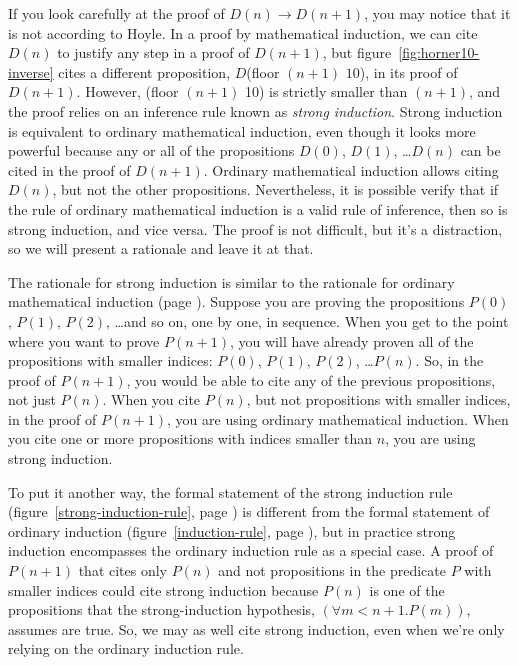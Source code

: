 If you look carefully at the proof of $D(n) \rightarrow D(n+1)$,
you may notice that it is not according to Hoyle.
In a proof by mathematical induction,
we can cite $D(n)$ to justify any step in a proof of $D(n+1)$,
but figure~\ref{fig:horner10-inverse} cites a different
proposition, $D$\textsf{(floor $(n+1)$ $10$)},
in its proof of $D(n+1)$.
However, \textsf{(floor $(n+1)$ 10)}
is strictly smaller than $(n+1)$, and
the proof relies on an inference rule
known as \emph{strong induction}.
Strong induction is equivalent to ordinary mathematical induction,
even though it looks more powerful because any or all of the
propositions $D(0)$, $D(1)$, \dots $D(n)$ can be cited in the proof of $D(n+1)$.
Ordinary mathematical induction allows citing $D(n)$, but not the other
propositions.
Nevertheless, it is possible verify that if the rule of ordinary mathematical induction
is a valid rule of inference, then so is strong induction, and vice versa.
The proof is not difficult, but it's a distraction,
so we will present a rationale and leave it at that.

\label{strong-induction-rationale}
The rationale for
strong induction is similar to
the rationale for ordinary mathematical induction (page \pageref{induction-rationale}).
Suppose you are proving the propositions
$P(0)$, $P(1)$, $P(2)$, \dots and so on,
one by one, in sequence.
When you get to the point where you want to prove $P(n+1)$,
you will have already proven all of the propositions
with smaller indices:
$P(0)$, $P(1)$, $P(2)$, \dots $P(n)$.
So, in the proof of $P(n+1)$, you would be able to
cite any of the previous propositions, not just $P(n)$.
When you cite $P(n)$, but not propositions with smaller indices,
in the proof of $P(n+1)$, you are using ordinary mathematical induction.
When you cite one or more propositions with indices smaller than $n$,
you are using strong induction.

To put it another way, the formal statement of the strong induction rule
(figure~\ref{strong-induction-rule}, page \pageref{strong-induction-rule})
is different from the formal statement of ordinary induction
(figure~\ref{induction-rule}, page \pageref{induction-rule}), but
in practice strong induction encompasses the ordinary induction rule
as a special case. A proof of $P(n+1)$ that cites only $P(n)$
and not propositions in the predicate $P$ with smaller indices
could cite strong induction because $P(n)$ is one of the propositions
that the strong-induction
hypothesis, $(\forall m<n+1.P(m))$, assumes are true.
So, we may as well cite strong induction, even when we're only relying
on the ordinary induction rule.

